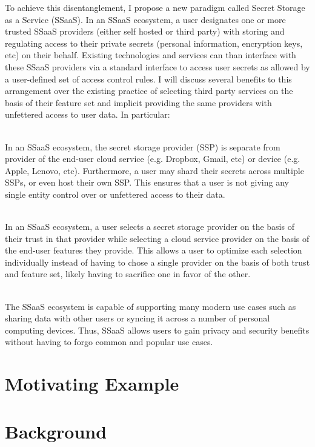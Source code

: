 To achieve this disentanglement, I propose a new paradigm called
Secret Storage as a Service (SSaaS). In an SSaaS ecosystem, a user
designates one or more trusted SSaaS providers (either self hosted or
third party) with storing and regulating access to their private
secrets (personal information, encryption keys, etc) on their
behalf. Existing technologies and services can than interface with
these SSaaS providers via a standard interface to access user secrets
as allowed by a user-defined set of access control rules. I will
discuss several benefits to this arrangement over the existing
practice of selecting third party services on the basis of their
feature set and implicit providing the same providers with unfettered
access to user data. In particular:

\begin{packed_desc}
\item[No Single Trusted Third Party] \hfill \\ In an SSaaS ecosystem,
  the secret storage provider (SSP) is separate from provider of the
  end-user cloud service (e.g. Dropbox, Gmail, etc) or device
  (e.g. Apple, Lenovo, etc). Furthermore, a user may shard their
  secrets across multiple SSPs, or even host their own SSP. This
  ensures that a user is not giving any single entity control over or
  unfettered access to their data.
\item[Separation of Duties] \hfill \\
  In an SSaaS ecosystem, a user selects a secret storage provider on
  the basis of their trust in that provider while selecting a cloud
  service provider on the basis of the end-user features they
  provide. This allows a user to optimize each selection individually
  instead of having to chose a single provider on the basis of both
  trust and feature set, likely having to sacrifice one in favor of
  the other.
\item[Support for Existing Use Cases] \hfill \\ The SSaaS ecosystem is
  capable of supporting many modern use cases such as sharing data
  with other users or syncing it across a number of personal computing
  devices. Thus, SSaaS allows users to gain privacy and security
  benefits without having to forgo common and popular use cases.
\end{packed_desc}

\section{Motivating Example}
\section{Background}

